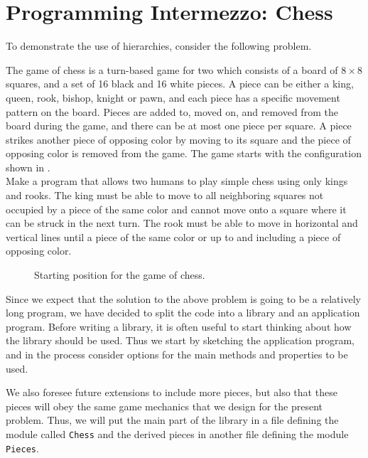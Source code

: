 \documentclass[fsharpNotes.tex]{subfiles}
\begin{document}
\section{Programming Intermezzo: Chess}
To demonstrate the use of hierarchies, consider the following problem.
\begin{task}{}
  The game of chess is a turn-based game for two which consists of a board of $8\times 8$ squares, and a set of 16 black and 16 white pieces. A piece can be either a king, queen, rook, bishop, knight or pawn, and each piece has a specific movement pattern on the board. Pieces are added to, moved on, and removed from the board during the game, and there can be at most one piece per square. A piece strikes another piece of opposing color by moving to its square and the piece of opposing color is removed from the game. The game starts with the configuration shown in .\\[\parskip]

  Make a program that allows two humans to play simple chess using only kings and rooks. The king must be able to move to all neighboring squares not occupied by a piece of the same color and cannot move onto a square where it can be struck in the next turn. The rook must be able to move in horizontal and vertical lines until a piece of the same color or up to and including a piece of opposing color.
\end{task}
\begin{figure}
  \centering
  \newgame
  \showboard
  \caption{Starting position for the game of chess.}
  \label{fig:chessNewGame}
\end{figure}
Since we expect that the solution to the above problem is going to be a relatively long program, we have decided to split the code into a library and an application program. Before writing a library, it is often useful to start thinking about how the library should be used. Thus we start by sketching the application program, and in the process consider options for the main methods and properties to be used.

We also foresee future extensions to include more pieces, but also that these pieces will obey the same game mechanics that we design for the present problem. Thus, we will put the main part of the library in a file defining the module called \lstinline{Chess} and the derived pieces in another file defining the module \lstinline{Pieces}.
\end{document}

